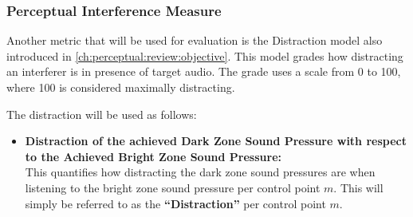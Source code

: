 \subsubsection{Perceptual Interference Measure}
Another metric that will be used for evaluation is the Distraction model also introduced in \autoref{ch:perceptual:review:objective}.
This model grades how distracting an interferer is in presence of target audio.
The grade uses a scale from 0 to 100, where 100 is considered maximally distracting.

The distraction will be used as follows:
\begin{itemize}
    \item \textbf{Distraction of the achieved Dark Zone Sound Pressure with respect to the Achieved Bright 
        Zone Sound Pressure:}\\
        This quantifies how distracting the dark zone sound pressures are when listening to the bright zone 
        sound pressure per control point $m$. 
        This will simply be referred to as the \textbf{``Distraction''} per control point $m$.
\end{itemize}

